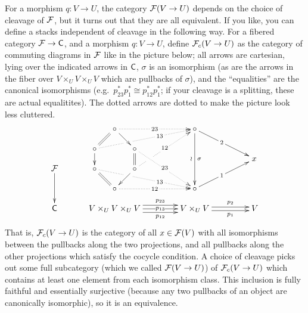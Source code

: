  \begin{remark}
   For a morphism $q:V\to U$, the category $\mathcal{F}(V\to U)$ depends on the choice of cleavage
   of $\mathcal{F}$, but it turns out that they are all equivalent. If you like, you can define a
   stacks independent of cleavage in the following way. For a fibered category $\mathcal{F}\to
   \text{\sf C}$, and a morphism $q:V\to U$, define $\mathcal{F}_c(V\to U)$ as the category of commuting
   diagrams in $\mathcal{F}$ like in the picture below; all arrows are cartesian, lying over the
   indicated arrows in $\text{\sf C}$, $\sigma$ is an isomorphism (as are the arrows in the fiber
   over $V\times_U V\times_U V$ which are pullbacks of $\sigma$), and the ``equalities''
   are the canonical isomorphisms (e.g.~$p_{23}^*p_1^*\cong p_{12}^*p_1^*$; if your
   cleavage is a splitting, these are actual equalitites). The dotted arrows are dotted
   to make the picture look less cluttered.
   \[\xymatrix@!0{
     & & & \circ \ar@{.>}[rrrr]|{\;23\;} \ar[dr] & & & &
        \circ \ar[ddd]^\sigma_\wr \ar p+<5.4pc,-2.7pc>|{\;2\;}\\
    & & \circ \ar@{.>}[rrrrru]|!{[ru];[rr]}{\hole\hole}|(.65){\;13\;}
    \ar@{=}[ur] \ar[d] & &
        \circ \ar@{.>}[rrrdd]|{\hole 23\hole} \ar@{=}[d]\\
    \F \ar[dd]& & \circ \ar@{.>}[rrrrrd]|!{[rd];[rr]}{\hole\hole}|(.65){\;13\;}
        \ar@{=}[dr] & &
        \circ \ar@{.>}[rrruu]|!{[u];[drrr]}{\hole\hole}|{\hole 12\hole} \ar[dl]\\
    & & & \circ \ar@{.>}[rrrr]|{\;12\;} & & & &
        \circ \ar p+<5.4pc,2.7pc>|{\;1\;}|(1.1){\txt{$x$}}\\
    \C& & & V\times_U V\times_U V
        \ar@<1ex>[rrrr]^<>(.5){p_{23}}
        \ar[rrrr]|<>(.5){p_{13}}
        \ar@<-1ex>[rrrr]_<>(.5){p_{12}}
      & & & & V\times_U V
        \ar@<.5ex>[rrr]^<>(.5){p_2}\ar@<-.5ex>[rrr]_<>(.5){p_1}
      & & & V
   }\]
    That is, $\mathcal{F}_c(V\to U)$ is the category of all $x\in \mathcal{F}(V)$ with all isomorphisms
   between the pullbacks along the two projections, and all pullbacks along the other
   projections which satisfy the cocycle condition. A choice of cleavage picks out some
   full subcategory (which we called $\mathcal{F}(V\to U)$) of $\mathcal{F}_c(V\to U)$ which contains at
   least one element from each isomorphism class. This inclusion is fully faithful and
   essentially surjective (because any two pullbacks of an object are canonically
   isomorphic), so it is an equivalence.


\end{remark}
